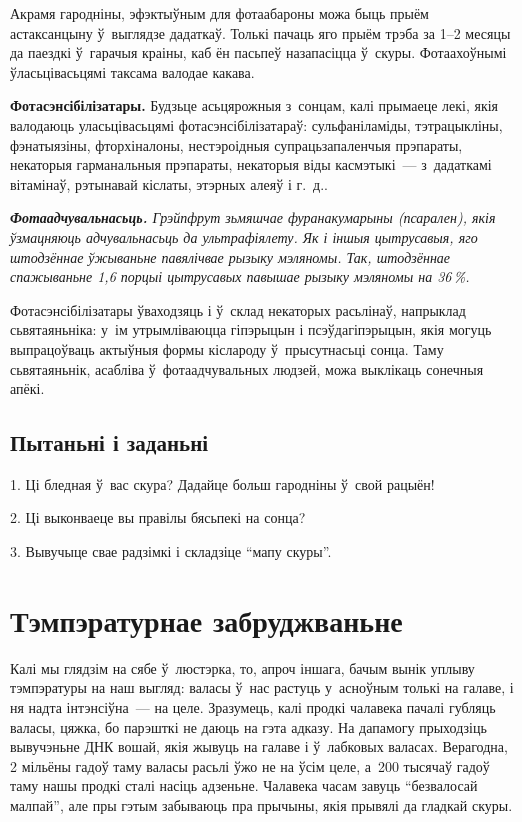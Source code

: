 Акрамя гародніны, эфэктыўным для фотаабароны можа быць прыём астаксанцыну ў~выглядзе дадаткаў. Толькі пачаць яго прыём трэба за 1--2 месяцы да паездкі ў~гарачыя краіны, каб ён пасьпеў назапасіцца ў~скуры. Фотаахоўнымі ўласьцівасьцямі таксама валодае какава.

\textbf{Фотасэнсібілізатары.} Будзьце асьцярожныя з~сонцам, калі прымаеце лекі, якія валодаюць уласьцівасьцямі фотасэнсібілізатараў: сульфаніламіды, тэтрацыкліны, фэнатыязіны, фторхіналоны, нестэроідныя супрацьзапаленчыя прэпараты, некаторыя гарманальныя прэпараты, некаторыя віды касмэтыкі~--- з~дадаткамі вітамінаў, рэтынавай кіслаты, этэрных алеяў і г.~д..

\emph{\textbf{Фотаадчувальнасьць.} Грэйпфрут зьмяшчае фуранакумарыны (псарален), якія ўзмацняюць адчувальнасьць да ультрафіялету. Як і іншыя цытрусавыя, яго штодзённае ўжываньне павялічвае рызыку мэляномы. Так, штодзённае спажываньне 1,6 порцыі цытрусавых павышае рызыку мэляномы на 36\,\%.} 

Фотасэнсібілізатары ўваходзяць і ў~склад некаторых расьлінаў, напрыклад сьвятаяньніка: у~ім утрымліваюцца гіпэрыцын і псэўдагіпэрыцын, якія могуць выпрацоўваць актыўныя формы кіслароду ў~прысутнасьці сонца. Таму сьвятаяньнік, асабліва ў~фотаадчувальных людзей, можа выклікаць сонечныя апёкі.

\subsection*{Пытаньні і заданьні}

1. Ці бледная ў~вас скура? Дадайце больш гародніны ў~свой рацыён!

2. Ці выконваеце вы правілы бясьпекі на сонца?

3. Вывучыце свае радзімкі і складзіце ``мапу скуры''.


\section{Тэмпэратурнае забруджваньне}

Калі мы глядзім на сябе ў~люстэрка, то, апроч іншага, бачым вынік уплыву тэмпэратуры на наш выгляд: валасы ў~нас растуць у~асноўным толькі на галаве, і ня надта інтэнсіўна~--- на целе. Зразумець, калі продкі чалавека пачалі губляць валасы, цяжка, бо парэшткі не даюць на гэта адказу. На дапамогу прыходзіць вывучэньне ДНК вошай, якія жывуць на галаве і ў~лабковых валасах. Верагодна, 2 мільёны гадоў таму валасы расьлі ўжо не на ўсім целе, а~200 тысячаў гадоў таму нашы продкі сталі насіць адзеньне. Чалавека часам завуць ``безвалосай малпай'', але пры гэтым забываюць пра прычыны, якія прывялі да гладкай скуры.

